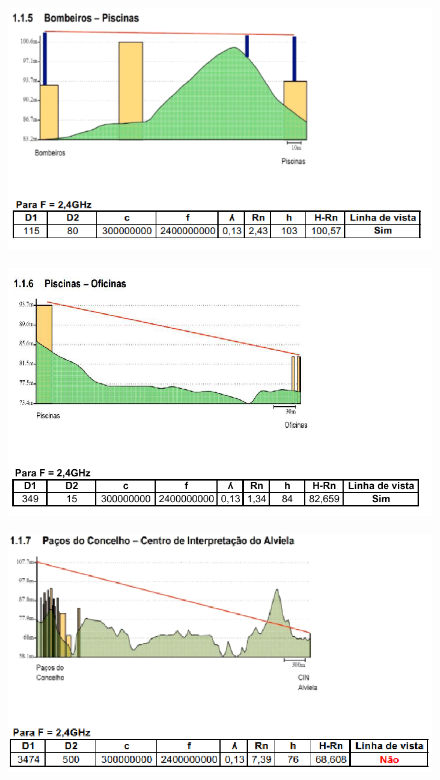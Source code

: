 \documentclass[a4paper,titlepage]{article}
\begin{document}
		\begin{figure}[H]
											\centering
											\includegraphics[width=\linewidth]{Img3.png}
		\end{figure}
		\begin{figure}[H]
											\centering
											\includegraphics[width=\linewidth]{Img4.png}
		\end{figure}
		\begin{figure}[H]
											\centering
											\includegraphics[width=\linewidth]{IMG5_1.png}
		\end{figure}
\end{document}
